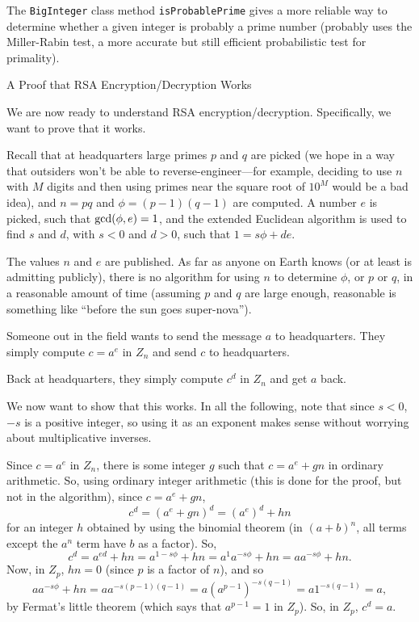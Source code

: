 The {\tt BigInteger} class method {\tt isProbablePrime} gives a more reliable way to
determine whether a given integer is probably a prime number (probably uses the
Miller-Rabin test, a more accurate but still efficient probabilistic test for primality).
\border

\vfil\eject

{\bigboldfont A Proof that RSA Encryption/Decryption Works}
\medskip

We are now ready to understand RSA encryption/decryption.  Specifically, we want to prove that it
works.
\medskip

Recall that at headquarters large primes $p$ and $q$ are picked (we hope in a way that
outsiders won't be able to reverse-engineer---for example, deciding to use $n$ with
$M$ digits
and then using primes near the square root of $10^M$ would be a bad idea), 
and $n = pq$ and $\phi = (p-1)(q-1)$
are computed.  A number $e$ is picked, such that $ \hbox{gcd}( \phi, e ) = 1$,
and the extended Euclidean algorithm is used to find $s$ and $d$, with $s<0$ and $d > 0$,
such that  $ 1 = s\phi + de$.
\medskip

The values $n$ and $e$ are published.  As far as anyone on Earth knows (or at least
is admitting publicly), there is
no algorithm for using $n$ to determine $\phi$, or $p$ or $q$, in a reasonable amount of
time (assuming $p$ and $q$ are large enough, reasonable is something like ``before the
sun goes super-nova'').
\medskip

Someone out in the field wants to send the message $a$ to headquarters.  They
simply compute $ c = a^e $ in $Z_n$ and send $c$ to headquarters.
\medskip

Back at headquarters, they simply compute $ c^d $ in $Z_n$ and get $a$ back.
\medskip

We now want to show that this works.  In all the following, note that since $s<0$, $-s$ is a
positive integer, so using it as an exponent makes sense without worrying about multiplicative
inverses.
\medskip

Since $c=a^e$ in $Z_n$, there is some integer $g$ such that
$ c = a^e + gn$ in ordinary arithmetic.
So,
using ordinary integer arithmetic (this is done for the proof, but not in the algorithm),
since $c = a^e + gn$,
$$
c^d = (a^e + gn)^d = (a^e)^d + hn$$
for an integer $h$ obtained by using the binomial theorem (in $(a+b)^n$, all terms except the
$a^n$ term have $b$ as a factor).
So,
$$
c^d =
a ^ {ed} + hn = a ^ { 1 - s \phi } +hn  = a^1 a ^ {-s\phi} + hn = a a^{-s\phi} +hn.
$$
Now, in $Z_p$, 
$hn = 0$ (since $p$ is a factor of $n$), and so
$$
a a^ {-s \phi } + hn = a a ^ {-s (p-1)(q-1)} = a (a^{p-1})^{-s(q-1)} = a 1^{-s(q-1)} = a,
$$
by Fermat's little theorem (which says that $ a^{p-1} = 1$ in $Z_p$).
So, in $Z_p$, $ c^d = a$.
\medskip

